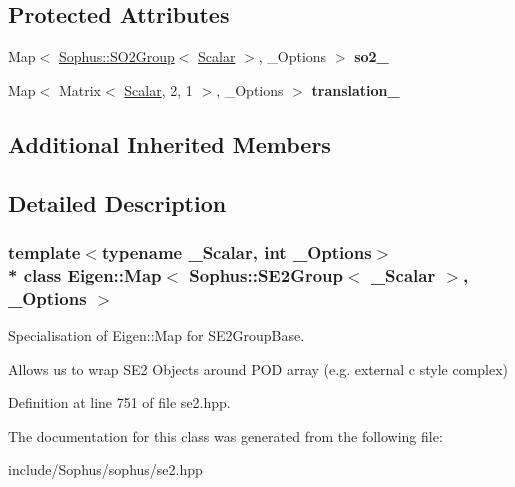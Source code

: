 \subsection*{Protected Attributes}
\begin{DoxyCompactItemize}
\item 
Map$<$ \hyperlink{class_sophus_1_1_s_o2_group}{Sophus\+::\+S\+O2\+Group}$<$ \hyperlink{class_eigen_1_1_map_3_01_sophus_1_1_s_e2_group_3_01___scalar_01_4_00_01___options_01_4_a786250298fc0362636d913ce5b96894c}{Scalar} $>$, \+\_\+\+Options $>$ {\bfseries so2\+\_\+}\hypertarget{class_eigen_1_1_map_3_01_sophus_1_1_s_e2_group_3_01___scalar_01_4_00_01___options_01_4_a97405ec3cd86e6d5eab7af7cc2bb537e}{}\label{class_eigen_1_1_map_3_01_sophus_1_1_s_e2_group_3_01___scalar_01_4_00_01___options_01_4_a97405ec3cd86e6d5eab7af7cc2bb537e}

\item 
Map$<$ Matrix$<$ \hyperlink{class_eigen_1_1_map_3_01_sophus_1_1_s_e2_group_3_01___scalar_01_4_00_01___options_01_4_a786250298fc0362636d913ce5b96894c}{Scalar}, 2, 1 $>$, \+\_\+\+Options $>$ {\bfseries translation\+\_\+}\hypertarget{class_eigen_1_1_map_3_01_sophus_1_1_s_e2_group_3_01___scalar_01_4_00_01___options_01_4_ab015eab7c1800ae8fb80790caf547481}{}\label{class_eigen_1_1_map_3_01_sophus_1_1_s_e2_group_3_01___scalar_01_4_00_01___options_01_4_ab015eab7c1800ae8fb80790caf547481}

\end{DoxyCompactItemize}
\subsection*{Additional Inherited Members}


\subsection{Detailed Description}
\subsubsection*{template$<$typename \+\_\+\+Scalar, int \+\_\+\+Options$>$\\*
class Eigen\+::\+Map$<$ Sophus\+::\+S\+E2\+Group$<$ \+\_\+\+Scalar $>$, \+\_\+\+Options $>$}

Specialisation of Eigen\+::\+Map for S\+E2\+Group\+Base. 

Allows us to wrap S\+E2 Objects around P\+OD array (e.\+g. external c style complex) 

Definition at line 751 of file se2.\+hpp.



The documentation for this class was generated from the following file\+:\begin{DoxyCompactItemize}
\item 
include/\+Sophus/sophus/se2.\+hpp\end{DoxyCompactItemize}

